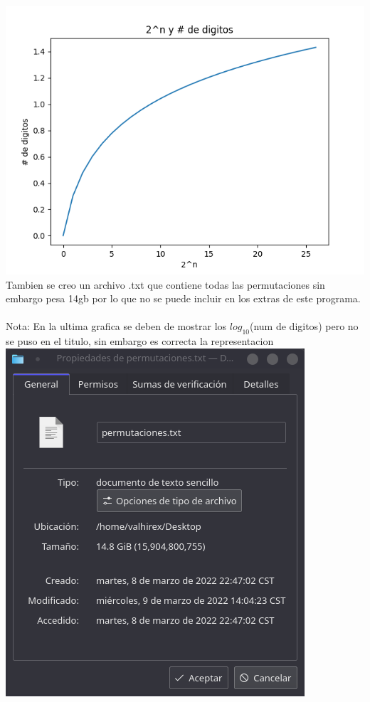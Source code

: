 \documentclass{article}
\begin{document}
\includegraphics{Graph4.png}
Tambien se creo un archivo .txt que contiene todas las permutaciones sin embargo pesa 14gb por lo que no se puede incluir en los extras de este programa.\\
\\Nota: En la ultima grafica se deben de mostrar los $log_{10}$(num de digitos) pero no se puso en el titulo, sin embargo es correcta la representacion
\\ \includegraphics{Archivo.png}
\end{document}
